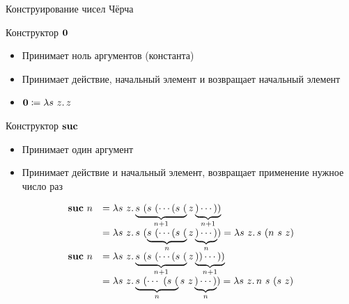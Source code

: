     \begin{frame}[fragile]{Конструирование чисел Чёрча}
        \pause
        \vspace{-0.5em}
        \begin{block}{Конструктор $\mathbf{0}$}
            \begin{itemize}
                \item Принимает ноль аргументов (константа)
                \item Принимает действие, начальный элемент и возвращает начальный элемент
                \item $\mathbf{0} \coloneqq \lambda s~z\ldotp z$
            \end{itemize}
        \end{block}
        \pause
        \begin{block}{Конструктор $\mathbf{suc}$}
            \begin{itemize}
                \item Принимает один аргумент
                \item Принимает действие и начальный элемент, возвращает применение нужное число раз
            \end{itemize}
            \[
                \begin{array}{l l}
                    \mathbf{suc} ~ n
                    & = \lambda s~z\ldotp \underbrace{s~(s~(\cdots (s~(}_{n+1} z\underbrace{)\cdots ))}_{n+1}  \\
                    & = \lambda s~z\ldotp s~(\underbrace{s~(\cdots (s~(}_n z\underbrace{)\cdots )}_n)
                    = \lambda s~z\ldotp s~(n~s~z) \\
                    \mathbf{suc} ~ n
                    & = \lambda s~z\ldotp \underbrace{s~(s~(\cdots (s~(}_{n+1} z\underbrace{))\cdots ))}_{n+1} \\
                    & = \lambda s~z\ldotp \underbrace{s~(\cdots~(s~(}_n s~z\underbrace{)\cdots )}_n)
                    = \lambda s~z\ldotp n~s~(s~z)
                \end{array}
            \]
        \end{block}
    \end{frame}

